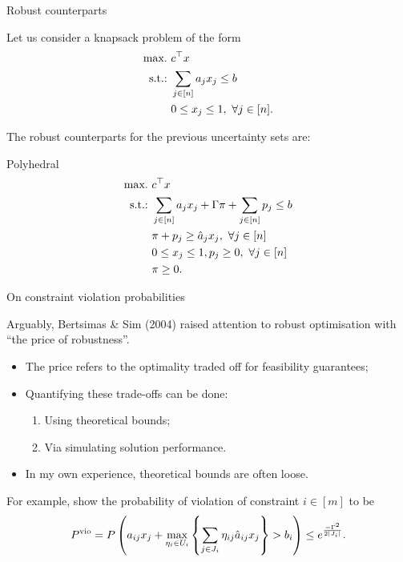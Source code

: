 \begin{frame}{Robust counterparts}

	Let us consider a knapsack problem of the form
	\begin{equation*}
	\begin{aligned}
		\mathop{\text{max.} \ } & c^\top x \\		
		\text{s.t.:~} & \sum_{j \in [n]} a_j x_j \le b \\
		& 0 \le x_j \le 1, \ \forall j \in [n].
	\end{aligned}
	\end{equation*}
	
	The \alert{robust counterparts} for the previous uncertainty sets are:
	
	\begin{block}{Polyhedral} 
		\vspace{-18pt}
		\begin{equation*}
		\begin{aligned}
			\mathop{\text{max.} \ } & c^\top x \\		
			\text{s.t.:~} & \sum_{j \in [n]} a_j x_j + \Gamma \pi + \sum_{j \in [n]} p_j \le b \\
			& \pi + p_j \ge \hat{a}_j x_j, \ \forall j \in [n] \\
			& 0 \le x_j \le 1, p_j \ge 0, \ \forall j \in [n] \\
			& \pi \ge 0.
		\end{aligned}
		\end{equation*}
	\end{block}
	
\end{frame}


\begin{frame}{On constraint violation probabilities}

	Arguably, \alert{Bertsimas \& Sim (2004)} raised attention to robust optimisation with ``the price of robustness''.
	\vspace{-6pt}
	\begin{itemize}
		\item The \alert{price} refers to the optimality traded off for feasibility guarantees;
		\item Quantifying these trade-offs can be done:
		\begin{enumerate}
			\item Using \alert{theoretical} bounds;
			\item Via \alert{simulating} solution performance.	
		\end{enumerate}
		\item In my own experience, theoretical bounds are often loose. 	
	\end{itemize}
	
	\pause
	For example, {\small \cite{bertsimas2004price}} show the probability of violation of constraint $i \in [m]$ to be
	\begin{equation*}
		P^{\text{vio}} = P\left(a_{ij}x_j + \max_{\eta_i \in U_i} \left\{ \sum_{j \in J_i}\eta_{ij}\hat{a}_{ij}x_j \right \} > b_i\right) \le e^{\frac{-\Gamma^2}{2|J_i|}}.
	\end{equation*}	
	
\end{frame}


